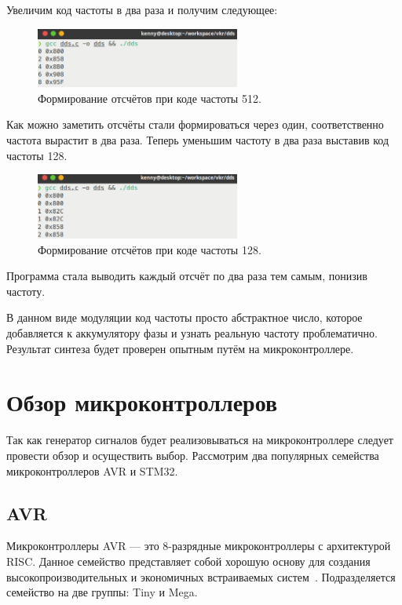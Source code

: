 	Увеличим код частоты в два раза и получим следующее:

\begin{figure}[H]
    \centering
    \includegraphics[width=0.6\textwidth]{../image/dds512.png}
    \caption{Формирование отсчётов при коде частоты 512.}
\end{figure}

	Как можно заметить отсчёты стали формироваться через один, соответственно частота вырастит в два раза. Теперь уменьшим частоту в два раза выставив код частоты 128.

\begin{figure}[H]
    \centering
    \includegraphics[width=0.6\textwidth]{../image/dds128.png}
    \caption{Формирование отсчётов при коде частоты 128.}
\end{figure}

	Программа стала выводить каждый отсчёт по два раза тем самым, понизив частоту.
	
	В данном виде модуляции код частоты просто абстрактное число, которое добавляется к аккумулятору фазы и узнать реальную частоту проблематично. Результат синтеза будет проверен опытным путём на микроконтроллере.
	
\section{Обзор микроконтроллеров}
	Так как генератор сигналов будет реализовываться на микроконтроллере следует провести обзор и осуществить выбор. Рассмотрим два популярных семейства микроконтроллеров AVR и STM32.
\subsection{AVR}
	Микроконтроллеры AVR --- это 8-разрядные микроконтроллеры с архитектурой RISC. Данное семейство представляет собой хорошую основу для создания высокопроизводительных и экономичных встраиваемых систем~\cite{avr}. Подразделяется семейство на две группы: Tiny и Mega.
	
